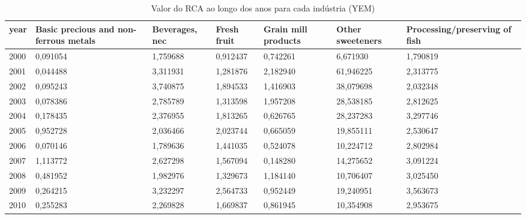 \begin{table}
\centering
\caption{Valor do RCA ao longo dos anos para cada indústria (YEM)}
\begin{tabular}{p{1cm}p{2cm}p{2cm}p{2cm}p{2cm}p{2cm}p{2cm}}
\toprule
 year &  Basic precious and non-ferrous metals &  Beverages, nec &  Fresh fruit &  Grain mill products &  Other sweeteners &  Processing/preserving of fish \\
\midrule
 2000 &                               0,091054 &        1,759688 &     0,912437 &             0,742261 &          6,671930 &                       1,790819 \\
 2001 &                               0,044488 &        3,311931 &     1,281876 &             2,182940 &         61,946225 &                       2,313775 \\
 2002 &                               0,095243 &        3,740875 &     1,894533 &             1,416903 &         38,079698 &                       2,032348 \\
 2003 &                               0,078386 &        2,785789 &     1,313598 &             1,957208 &         28,538185 &                       2,812625 \\
 2004 &                               0,178435 &        2,376955 &     1,813265 &             0,626765 &         28,237283 &                       3,297746 \\
 2005 &                               0,952728 &        2,036466 &     2,023744 &             0,665059 &         19,855111 &                       2,530647 \\
 2006 &                               0,070146 &        1,789636 &     1,441035 &             0,524078 &         10,224712 &                       2,802984 \\
 2007 &                               1,113772 &        2,627298 &     1,567094 &             0,148280 &         14,275652 &                       3,091224 \\
 2008 &                               0,481952 &        1,982976 &     1,329673 &             1,184140 &         10,706407 &                       3,025450 \\
 2009 &                               0,264215 &        3,232297 &     2,564733 &             0,952449 &         19,240951 &                       3,563673 \\
 2010 &                               0,255283 &        2,269828 &     1,669837 &             0,861945 &         10,354908 &                       2,953675 \\

\end{tabular}
\end{table}

